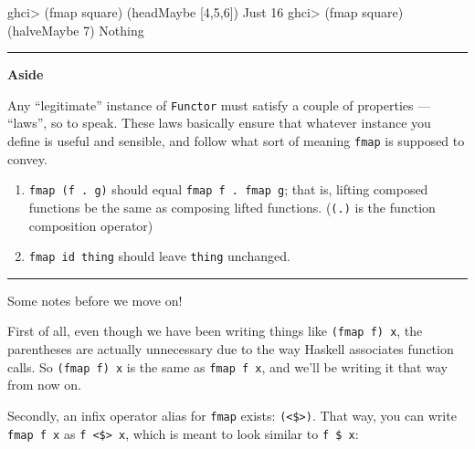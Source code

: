\documentclass[]{article}
\newenvironment{Shaded}{\begin{snugshade}}{\end{snugshade}}
\newcommand{\DataTypeTok}[1]{\textcolor[rgb]{0.13,0.29,0.53}{#1}}
\newcommand{\DecValTok}[1]{\textcolor[rgb]{0.00,0.00,0.81}{#1}}
\newcommand{\FunctionTok}[1]{\textcolor[rgb]{0.00,0.00,0.00}{#1}}
\newcommand{\NormalTok}[1]{#1}
\begin{document}
\begin{Shaded}
\begin{Highlighting}[]
\NormalTok{ghci}\FunctionTok{>}\NormalTok{ (fmap square) (headMaybe [}\DecValTok{4}\NormalTok{,}\DecValTok{5}\NormalTok{,}\DecValTok{6}\NormalTok{])}
\DataTypeTok{Just} \DecValTok{16}
\NormalTok{ghci}\FunctionTok{>}\NormalTok{ (fmap square) (halveMaybe }\DecValTok{7}\NormalTok{)}
\DataTypeTok{Nothing}
\end{Highlighting}
\end{Shaded}

\begin{center}\rule{0.5\linewidth}{\linethickness}\end{center}

\textbf{Aside}

Any ``legitimate'' instance of \texttt{Functor} must satisfy a couple of
properties --- ``laws'', so to speak. These laws basically ensure that whatever
instance you define is useful and sensible, and follow what sort of meaning
\texttt{fmap} is supposed to convey.

\begin{enumerate}
\def\labelenumi{\arabic{enumi}.}
\tightlist
\item
  \texttt{fmap\ (f\ .\ g)} should equal \texttt{fmap\ f\ .\ fmap\ g}; that is,
  lifting composed functions be the same as composing lifted functions.
  (\texttt{(.)} is the function composition operator)
\item
  \texttt{fmap\ id\ thing} should leave \texttt{thing} unchanged.
\end{enumerate}

\begin{center}\rule{0.5\linewidth}{\linethickness}\end{center}

Some notes before we move on!

First of all, even though we have been writing things like
\texttt{(fmap\ f)\ x}, the parentheses are actually unnecessary due to the way
Haskell associates function calls. So \texttt{(fmap\ f)\ x} is the same as
\texttt{fmap\ f\ x}, and we'll be writing it that way from now on.

Secondly, an infix operator alias for \texttt{fmap} exists:
\texttt{(\textless{}\$\textgreater{})}. That way, you can write
\texttt{fmap\ f\ x} as \texttt{f\ \textless{}\$\textgreater{}\ x}, which is
meant to look similar to \texttt{f\ \$\ x}:

\begin{Shaded}
\end{Shaded}
\end{document}
